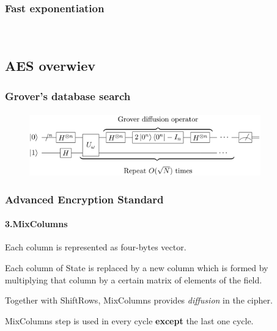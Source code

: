 \begin{frame}
	\frametitle{Fast exponentiation}
		\framesubtitle{}

		{\normalsize
		\\
		}
		

\end{frame}



\subsection{AES overwiev} 
\begin{frame}
	\frametitle{Grover's database search}
		\framesubtitle{}
	\vspace{0.5cm}
		\begin{figure}
		\centering
		\includegraphics[width=10cm]{grdiffusion}
		\label{fig:grdiffusion grdiffusion}
	\end{figure}
\end{frame}
\begin{frame}
	\frametitle{Advanced Encryption Standard}
		\framesubtitle{3.MixColumns}
		\vfill
	
	\begin{block}{}
    	{Each column is represented as four-bytes vector.}\\
    \end{block}
    \begin{block}{}
		{Each column of State is replaced by a new column which is formed by multiplying that column by a certain 			matrix of elements of the field.}\\	
	\end{block}	
	    \begin{block}{}
		{Together with ShiftRows, MixColumns provides \textit{diffusion} in the cipher.}\\	
	\end{block}
		\begin{alertblock}{}
		{MixColumns step is used in every cycle \textbf{except} the last one cycle.}\\
		\end{alertblock}
\end{frame}

